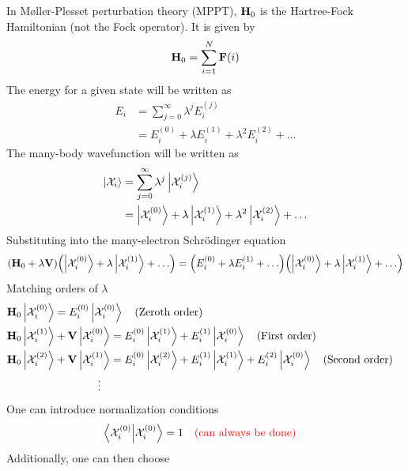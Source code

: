 \documentclass[12pt,a4paper,titlepage]{article}
\newcommand{\Chi}{\mathcal{X}} %
\begin{document}
In M{\o}ller-Plesset perturbation theory (MPPT), $\vb{H}_{0}$ is the Hartree-Fock Hamiltonian (not the Fock operator). It is given by
\begin{equation}
\vb{H}_{0}=\sum_{i=1}^{N}\vb{F}(i)
\end{equation}
The energy for a given state will be written as
\begin{equation}
\begin{aligned}
E_{i}&=\sum_{j=0}^{\infty}\lambda^{j}E_{i}^{(j)}\\
&=E_{i}^{(0)}+\lambda E_{i}^{(1)}+\lambda^{2}E_{i}^{(2)}+\ldots
\end{aligned}
\end{equation}
The many-body wavefunction will be written as
\begin{equation}
\begin{aligned}
\ket{\Chi_{i}}&=\sum_{j=0}^{\infty}\lambda^{j}\ket{\Chi_{i}^{(j)}}\\
&=\ket{\Chi_{i}^{(0)}}+\lambda\ket{\Chi_{i}^{(1)}}+\lambda^{2}\ket{\Chi_{i}^{(2)}}+\ldots
\end{aligned}
\end{equation}
Substituting into the many-electron Schr\"{o}dinger equation
\begin{equation}
\qty(\vb{H}_{0}+\lambda\vb{V})\qty(\ket{\Chi_{i}^{(0)}}+\lambda\ket{\Chi_{i}^{(1)}}+\ldots)=\qty(E_{i}^{(0)}+\lambda E_{i}^{(1)}+\ldots)\qty(\ket{\Chi_{i}^{(0)}}+\lambda\ket{\Chi_{i}^{(1)}}+\ldots)
\end{equation}
Matching orders of $\lambda$
\begin{equation}
\begin{aligned}
\vb{H}_{0}\ket{\Chi_{i}^{(0)}}&=E_{i}^{(0)}\ket{\Chi_{i}^{(0)}}\qq{(Zeroth order)}\\
\vb{H}_{0}\ket{\Chi_{i}^{(1)}}&+\vb{V}\ket{\Chi_{i}^{(0)}}=E_{i}^{(0)}\ket{\Chi_{i}^{(1)}}+E_{i}^{(1)}\ket{\Chi_{i}^{(0)}}\qq{(First order)}\\
\vb{H}_{0}\ket{\Chi_{i}^{(2)}}&+\vb{V}\ket{\Chi_{i}^{(1)}}=E_{i}^{(0)}\ket{\Chi_{i}^{(2)}}+E_{i}^{(1)}\ket{\Chi_{i}^{(1)}}+E_{i}^{(2)}\ket{\Chi_{i}^{(0)}}\qq{(Second order)}\\
&\qquad\qquad\vdots
\end{aligned}
\end{equation}
One can introduce normalization conditions
\begin{equation}
\ip{\Chi_{i}^{(0)}}{\Chi_{i}^{(0)}}=1\qq{\color{red}(can always be done)}
\end{equation}
Additionally, one can then choose
\end{document}
